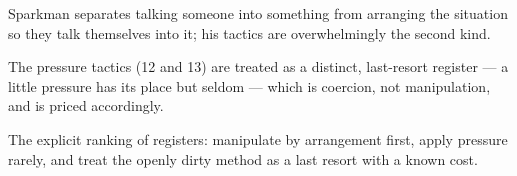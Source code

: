 

\begin{distilled}
  \item Sparkman separates talking someone into something from arranging the situation so they talk themselves into it; his tactics are overwhelmingly the second kind.
  \item The pressure tactics (12 and 13) are treated as a distinct, last-resort register --- a little pressure has its place but seldom --- which is coercion, not manipulation, and is priced accordingly.
\end{distilled}

\begin{unique}
  \item The explicit ranking of registers: manipulate by arrangement first, apply pressure rarely, and treat the openly dirty method as a last resort with a known cost.
\end{unique}
